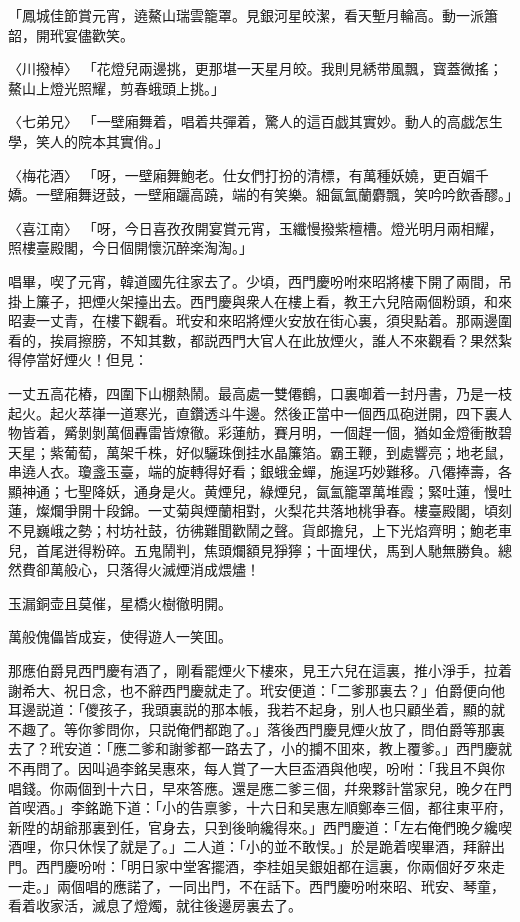\begin{myquote}
「鳳城佳節賞元宵，遶鰲山瑞雲籠罩。見銀河星皎潔，看天塹月輪高。動一派簫韶，開玳宴儘歡笑。

{\markfont〈川撥棹〉}
「花燈兒兩邊挑，更那堪一天星月皎。我則見綉带風飄，寳蓋微搖；鰲山上燈光照耀，剪春蛾頭上挑。」

{\markfont〈七弟兄〉}
「一壁廂舞着，唱着共彈着，驚人的這百戯其實妙。動人的高戯怎生學，笑人的院本其實俏。」

{\markfont〈梅花酒〉}
「呀，一壁廂舞鮑老。仕女們打扮的清標，有萬種妖嬈，更百媚千嬌。一壁廂舞迓鼓，一壁廂躧高蹺，端的有笑樂。細氤氳蘭麝飄，笑吟吟飲香醪。」

{\markfont〈喜江南〉}
「呀，今日喜孜孜開宴賞元宵，玉纖慢撥紫檀槽。燈光明月兩相耀，照樓臺殿閣，今日個開懷沉醉楽淘淘。」
\end{myquote}

唱畢，喫了元宵，韓道國先往家去了。少頃，西門慶吩咐來昭將樓下開了兩間，吊掛上簾子，把煙火架擡出去。西門慶與衆人在樓上看，教王六兒陪兩個粉頭，和來昭妻一丈青，在樓下觀看。玳安和來昭將煙火安放在街心裏，須臾點着。那兩邊圍看的，挨肩擦膀，不知其數，都説西門大官人在此放煙火，誰人不來觀看？果然紮得停當好煙火！但見：

一丈五高花樁，四圍下山棚熱鬧。最高處一雙僊鶴，口裏啣着一封丹書，乃是一枝起火。起火萃嵂一道寒光，直鑽透斗牛邊。然後正當中一個西瓜砲迸開，四下裏人物皆着，觱剝剝萬個轟雷皆燎徹。彩蓮舫，賽月明，一個趕一個，猶如金燈衝散碧天星；紫葡萄，萬架千株，好似驪珠倒挂水晶簾箔。霸王鞭，到處響亮；地老鼠，串遶人衣。瓊盞玉臺，端的旋轉得好看；銀蛾金蟬，施逞巧妙難移。八僊捧壽，各顯神通；七聖降妖，通身是火。黄煙兒，綠煙兒，氤氳籠罩萬堆霞；緊吐蓮，慢吐蓮，燦爛爭開十段錦。一丈菊與煙蘭相對，火梨花共落地桃爭春。樓臺殿閣，頃刻不見巍峨之勢；村坊社鼓，彷彿難聞歡鬧之聲。貨郎擔兒，上下光焰齊明；鮑老車兒，首尾迸得粉碎。五鬼鬧判，焦頭爛額見猙獰；十面埋伏，馬到人馳無勝負。總然費卻萬般心，只落得火滅煙消成煨燼！

\begin{myquote}
玉漏銅壶且莫催，星橋火樹徹明開。

萬般傀儡皆成妄，使得遊人一笑囬。
\end{myquote}

那應伯爵見西門慶有酒了，剛看罷煙火下樓來，見王六兒在這裏，推小淨手，拉着謝希大、祝日念，也不辭西門慶就走了。玳安便道：「二爹那裏去？」伯爵便向他耳邊説道：「儍孩子，我頭裏説的那本帳，我若不起身，别人也只顧坐着，顯的就不趣了。等你爹問你，只説俺們都跑了。」落後西門慶見煙火放了，問伯爵等那裏去了？玳安道：「應二爹和謝爹都一路去了，小的攔不囬來，教上覆爹。」西門慶就不再問了。因叫過李銘吴惠來，每人賞了一大巨盃酒與他喫，吩咐：「我且不與你唱錢。你兩個到十六日，早來答應。還是應二爹三個，幷衆夥計當家兒，晚夕在門首喫酒。」李銘跪下道：「小的告禀爹，十六日和吴惠左順鄭奉三個，都往東平府，新陞的胡爺那裏到任，官身去，只到後晌纔得來。」西門慶道：「左右俺們晚夕纔喫酒哩，你只休悮了就是了。」二人道：「小的並不敢悮。」於是跪着喫畢酒，拜辭出門。西門慶吩咐：「明日家中堂客擺酒，李桂姐吴銀姐都在這裏，你兩個好歹來走一走。」兩個唱的應諾了，一同出門，不在話下。西門慶吩咐來昭、玳安、琴童，看着收家活，滅息了燈燭，就往後邊房裏去了。

